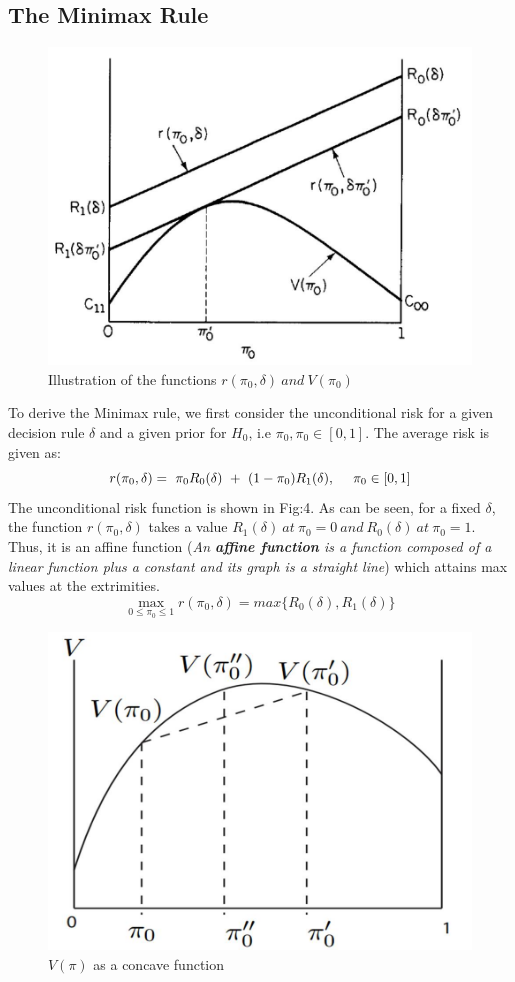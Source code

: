 \documentclass[a4paper,english,12pt]{article}
\begin{document}
\subsection{The Minimax Rule}
\begin{figure}[h]
	\centering
	\includegraphics[width=0.9\linewidth]{Figures/minimax1}
	\caption[abc]{Illustration of the functions $r(\pi_0,\delta)~and~V(\pi_0)$}
	\label{fig:minimax1}
\end{figure}
To derive the Minimax rule, we first consider the unconditional risk for a given decision rule $\delta$ and a given prior for $H_0$, i.e $\pi_0 , \pi_0 \in [0,1]$. The average risk is given as:
\begin{equation}
r(\pi_0,\delta)=~\pi_0R_0(\delta)~+~(1-\pi_0)R_1(\delta), ~~~~\pi_0 \in [0,1]\\
\end{equation}
The unconditional risk function is shown in Fig:4. As can be seen, for a fixed $\delta$, the function $r(\pi_0,\delta)$ takes a value $R_1(\delta)~at~\pi_0=0~and~R_0(\delta)~at~\pi_0=1$. Thus, it is an affine function (\textit{An \textbf{affine function} is a function composed of a linear function plus a constant and its graph is a straight line}) which attains max values at the extrimities.
\begin{equation}
	\mathop {\max }\limits_{0 \le {\pi _0} \le 1} r({\pi _0},\delta ) = max\{ {R_0}(\delta ),{R_1}(\delta )\}
\end{equation}
\begin{figure}[h]
	\centering
	\includegraphics[width=0.7\linewidth]{Figures/concave}
	\caption{$V(\pi)$ as a concave function}
	\label{fig:concave}
\end{figure}
\end{document}
